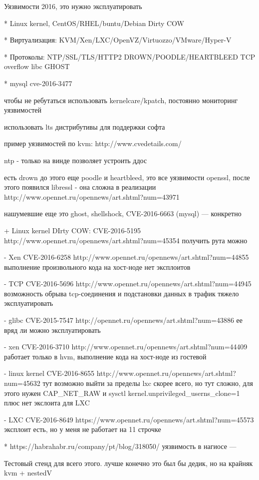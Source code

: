Уязвимости 2016, это нужно эксплуатировать

* Linux kernel, CentOS/RHEL/buntu/Debian Dirty COW

* Виртуализация: KVM/Xen/LXC/OpenVZ/Virtuozzo/VMware/Hyper-V

* Протоколы: NTP/SSL/TLS/HTTP2 DROWN/POODLE/HEARTBLEED TCP overflow libc GHOST

* mysql cve-2016-3477

чтобы не ребутаться использовать kernelcare/kpatch, постоянно мониторинг уязвимостей

использовать lts дистрибутивы для поддержки софта

пример уязвимостей по kvm: http://www.cvedetails.com/

ntp - только на винде позволяет устроить ддос

есть drown до этого еще poodle и heartbleed, это все уязвимости openssl, после этого появился libressl - она сложна в реализации http://www.opennet.ru/opennews/art.shtml?num=43971

нашумевшие еще это ghost, shellshock, CVE-2016-6663 (mysql)
--- конкретно

+ Linux kernel DIrty COW: CVE-2016-5195 http://www.opennet.ru/opennews/art.shtml?num=45354
получить рута можно

- Xen CVE-2016-6258 http://www.opennet.ru/opennews/art.shtml?num=44855
выполнение произвольного кода на хост-ноде
нет эксплоитов

- TCP CVE-2016-5696 http://www.opennet.ru/opennews/art.shtml?num=44945
возможность обрыва tcp-соединения и подстановки данных в трафик
тяжело эксплуатировать

- glibc CVE-2015-7547 http://opennet.ru/opennews/art.shtml?num=43886
ее вряд ли можно эксплуатировать

- xen CVE-2016-3710 http://www.opennet.ru/opennews/art.shtml?num=44409
работает только в hvm, выполнение кода на хост-ноде из гостевой

- linux kernel CVE-2016-8655 http://www.opennet.ru/opennews/art.shtml?num=45632
тут возможно выйти за пределы lxc скорее всего, но тут сложно, для этого нужен CAP\_NET\_RAW и sysctl kernel.unprivileged\_userns\_clone=1 плюс нет экслоита для LXC

- LXC CVE-2016-8649 https://www.opennet.ru/opennews/art.shtml?num=45573
эксплоит есть, но у меня не работает на 11 строчке

* https://habrahabr.ru/company/pt/blog/318050/ уязвимость в нагиосе
---

Тестовый стенд для всего этого.
лучше конечно это был бы дедик, но на крайняк kvm + nestedV

